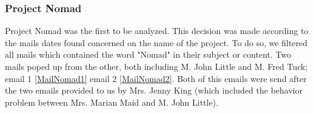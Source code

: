 \subsubsection{Project Nomad}
Project Nomad was the first to be analyzed. This decision was made according to the mails dates found concerned on the name of the project. To do so, we filtered all mails which contained the word "Nomad" in their subject or content. Two mails poped up from the other, both including M. John Little and M. Fred Tuck; email 1 \ref{MailNomad1} email 2 \ref{MailNomad2}. Both of this emails were send after the two emails provided to us by Mrs. Jenny King (which included the behavior problem between Mrs. Marian Maid and M. John Little).